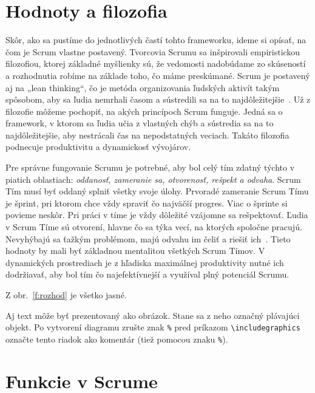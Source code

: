 \documentclass[10pt,slovak,a4paper]{article}
\begin{document}
\section{Hodnoty a filozofia} \label{hodnoty}
Skôr, ako sa pustíme do jednotlivých častí tohto frameworku, ideme si opísať, na čom je Scrum vlastne postavený. Tvorcovia Scrumu sa inšpirovali empiristickou filozofiou, ktorej základné myšlienky sú, že vedomosti nadobúdame zo skúseností a rozhodnutia robíme na základe toho, čo máme preskúmané. Scrum je postavený aj na „lean thinking“, čo je metóda organizovania ľudských aktivít takým spôsobom, aby sa ľudia nemrhali časom a sústredili sa na to najdôležitejšie~\cite{schwaber2020scrum}. Už z filozofie môžeme pochopiť, na akých princípoch Scrum funguje. Jedná sa o framework, v ktorom sa ľudia učia z vlastných chýb a sústredia sa na to najdôležitejšie, aby nestrácali čas na nepodstatných veciach. Takáto filozofia podnecuje produktivitu a dynamickosť vývojárov.

Pre správne fungovanie Scrumu je potrebné, aby bol celý tím zdatný týchto v piatich oblastiach: \emph{oddanosť, zameranie sa, otvorenosť, rešpekt a odvaha}. Scrum Tím musí byť oddaný splniť všetky svoje úlohy. Prvoradé zameranie Scrum Tímu je šprint, pri ktorom chce vždy spraviť čo najväčší progres. Viac o šprinte si povieme neskôr. Pri práci v tíme je vždy dôležité vzájomne sa rešpektovať. Ľudia v Scrum Tíme sú otvorení, hlavne čo sa týka vecí, na ktorých spoločne pracujú. Nevyhýbajú sa ťažkým problémom, majú odvahu im čeliť a riešiť ich~\cite{schwaber2020scrum}. Tieto hodnoty by mali byť základnou mentalitou všetkých Scrum Tímov. V dynamických prostrediach je z hľadiska maximálnej produktivity nutné ich dodržiavať, aby bol tím čo najefektívnejší a využíval plný potenciál Scrumu. 


Z obr.~\ref{f:rozhod} je všetko jasné. 

\begin{figure*}[tbh]
\centering
Aj text môže byť prezentovaný ako obrázok. Stane sa z neho označný plávajúci objekt. Po vytvorení diagramu zrušte znak \texttt{\%} pred príkazom \verb|\includegraphics| označte tento riadok ako komentár (tiež pomocou znaku \texttt{\%}).
\caption{Náhodný obrázok.}
\label{f:rozhod}
\end{figure*}

\cite{agile}

\cite{techScrum}

\section{Funkcie v Scrume} \label{funkcie}
\end{document}
